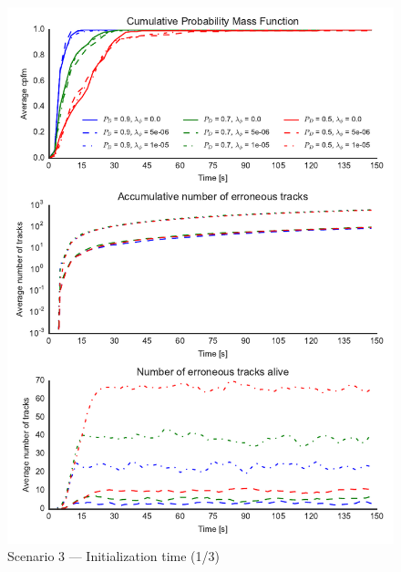 \begin{figure}
\centering
\includegraphics{Figures/plots/Scenario3_Init-Time(1-3).pdf}
\caption{Scenario 3 --- Initialization time (1/3)}\label{fig:init3_time_1-3}
\end{figure}

